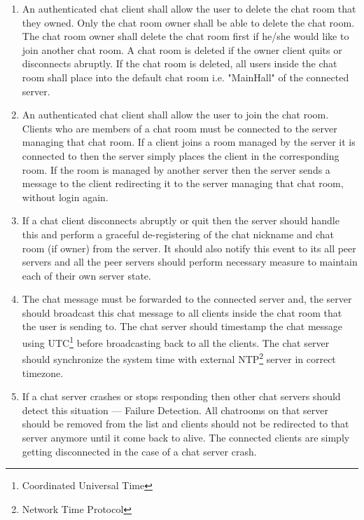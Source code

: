\documentclass[dareport.tex]{subfiles}
\begin{document}
\begin{enumerate}[leftmargin=*]
\item An authenticated chat client shall allow the user to delete the chat room that they owned. Only the chat room owner shall be able to delete the chat room. The chat room owner shall delete the chat room first if he/she would like to join another chat room. A chat room is deleted if the owner client quits or disconnects abruptly. If the chat room is deleted, all users inside the chat room shall place into the default chat room i.e. "MainHall" of the connected server.

\item An authenticated chat client shall allow the user to join the chat room. Clients who are members of a chat room must be connected to the server managing that chat room. If a client joins a room managed by the server it is connected to then the server simply places the client in the corresponding room. If the room is managed by another server then the server sends a message to the client redirecting it to the server managing that chat room, without login again.

\item If a chat client disconnects abruptly or quit then the server should handle this and perform a graceful de-registering of the chat nickname and chat room (if owner) from the server. It should also notify this event to its all peer servers and all the peer servers should perform necessary measure to maintain each of their own server state.

\item The chat message must be forwarded to the connected server and, the server should broadcast this chat message to all clients inside the chat room that the user is sending to. The chat server should timestamp the chat message using UTC\footnote{Coordinated Universal Time} before broadcasting back to all the clients. The chat server should synchronize the system time with external NTP\footnote{Network Time Protocol} server in correct timezone.

\item If a chat server crashes or stops responding then other chat servers should detect this situation --- Failure Detection. All chatrooms on that server should be removed from the list and clients should not be redirected to that server anymore until it come back to alive. The connected clients are simply getting disconnected in the case of a chat server crash.

\end{enumerate}
\end{document}
